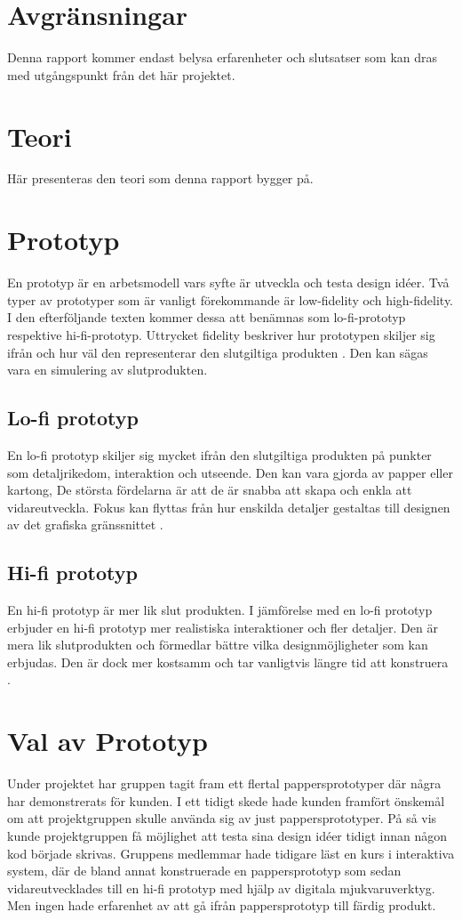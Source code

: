 \section{Avgränsningar}
Denna rapport kommer endast belysa erfarenheter och slutsatser som kan dras med utgångspunkt från det här projektet.

\section{Teori}
Här presenteras den teori som denna rapport bygger på.

\section{Prototyp}
En prototyp är en arbetsmodell vars syfte är utveckla och testa design idéer. Två typer av prototyper som är vanligt förekommande är low-fidelity och high-fidelity. I den efterföljande texten kommer dessa att benämnas som lo-fi-prototyp respektive hi-fi-prototyp. Uttrycket fidelity beskriver hur prototypen skiljer sig ifrån och hur väl den representerar den  slutgiltiga produkten \cite{prototypeChoise}. Den kan sägas vara en simulering av slutprodukten.     

\subsection{Lo-fi prototyp}
En lo-fi prototyp skiljer sig mycket ifrån den slutgiltiga produkten på punkter som detaljrikedom, interaktion och utseende. Den kan vara gjorda av papper eller kartong, De största fördelarna är att de är snabba att skapa och enkla att vidareutveckla. Fokus kan flyttas från hur enskilda detaljer gestaltas till designen av det grafiska gränssnittet    \cite{prototypeChoise}.

\subsection{Hi-fi prototyp}
En hi-fi prototyp är mer lik slut produkten. I jämförelse med en lo-fi prototyp erbjuder en hi-fi prototyp mer realistiska interaktioner och fler detaljer. Den är mera lik slutprodukten och förmedlar bättre vilka designmöjligheter som kan erbjudas. Den är dock mer kostsamm och tar vanligtvis längre tid att konstruera \cite{prototypeChoise}.

\section{Val av Prototyp} 
Under projektet har gruppen tagit fram ett flertal pappersprototyper där några har demonstrerats för kunden. I ett tidigt skede hade kunden framfört önskemål om att projektgruppen skulle använda sig av just pappersprototyper. På så vis kunde projektgruppen få möjlighet att testa sina design idéer tidigt innan någon kod började skrivas. Gruppens medlemmar hade tidigare läst en kurs i interaktiva system, där de bland annat konstruerade en pappersprototyp som sedan vidareutvecklades till en hi-fi prototyp med hjälp av digitala mjukvaruverktyg. Men ingen hade erfarenhet av att gå ifrån pappersprototyp till färdig produkt. 

